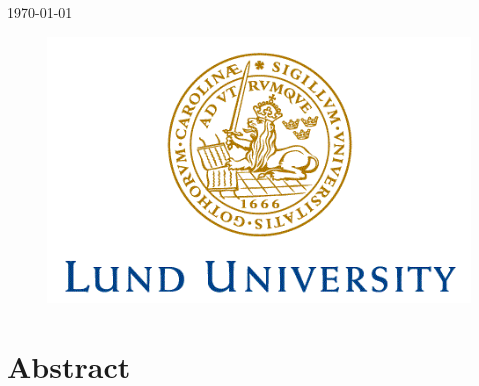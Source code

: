 \documentclass[11pt,a4paper]{article}
\begin{document}
\begin{titlepage}


{\large \today}\\[2cm] %


\begin{figure}[!h]
\centering
\includegraphics[scale=0.6]{Logo.png}
\end{figure} %
 

\vfill %



\end{titlepage}

\newpage

\null\vfill
\thispagestyle{empty}
\section*{Abstract}
\end{document}
